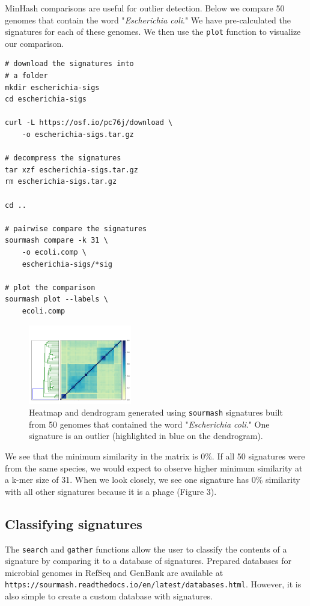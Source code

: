 \documentclass[10pt,a4paper,twocolumn]{article}
\begin{document}
MinHash comparisons are useful for outlier detection. Below we compare 50 genomes that contain the word "\textit{Escherichia coli}." We have pre-calculated the signatures for each of these genomes. We then use the \lstinline{plot} function to visualize our comparison.

\begin{lstlisting}
# download the signatures into 
# a folder
mkdir escherichia-sigs
cd escherichia-sigs

curl -L https://osf.io/pc76j/download \ 
    -o escherichia-sigs.tar.gz    

# decompress the signatures
tar xzf escherichia-sigs.tar.gz
rm escherichia-sigs.tar.gz

cd ..

# pairwise compare the signatures
sourmash compare -k 31 \ 
    -o ecoli.comp \ 
    escherichia-sigs/*sig
    
# plot the comparison
sourmash plot --labels \ 
    ecoli.comp
\end{lstlisting}

\begin{figure}
\centering
\includegraphics[width=0.4\textwidth]{compmatrix.pdf}
\caption{\label{fig:compmatrix} Heatmap and dendrogram generated using \lstinline{sourmash} signatures built from 50 genomes that contained the word "\textit{Escherichia coli}." One signature is an outlier (highlighted in blue on the dendrogram).}
\end{figure}

We see that the minimum similarity in the matrix is 0\%. If all 50 signatures were from the same species, we would expect to observe higher minimum similarity at a k-mer size of 31. When we look closely, we see one signature has 0\% similarity with all other signatures because it is a phage (Figure 3).

\subsection*{Classifying signatures}

The \lstinline{search} and \lstinline{gather} functions allow the user to classify the contents of a signature by comparing it to a database of signatures. Prepared databases for microbial genomes in RefSeq and GenBank are available at \lstinline{https://sourmash.readthedocs.io/en/latest/databases.html}. However, it is also simple to create a custom database with signatures. 
\end{document}
